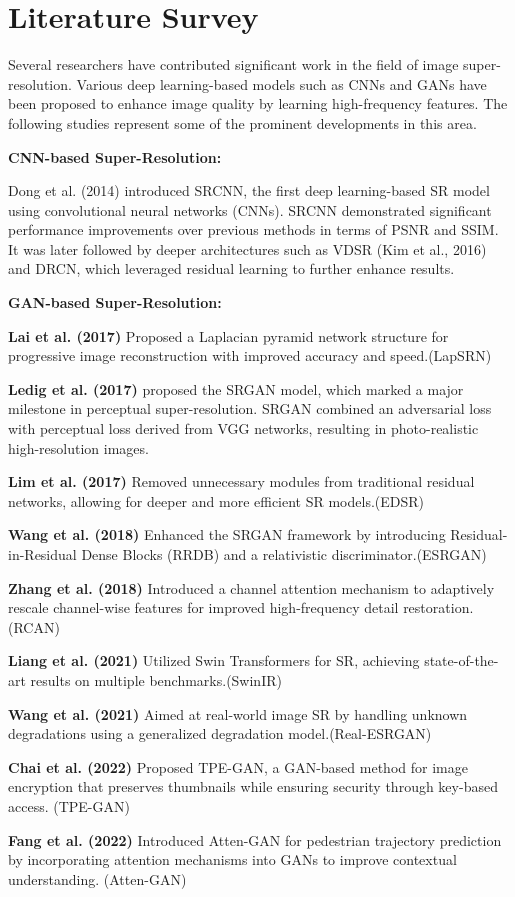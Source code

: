 \chapter{Literature Survey}

Several researchers have contributed significant work in the field of image super-resolution. Various deep learning-based models such as CNNs and GANs have been proposed to enhance image quality by learning high-frequency features. The following studies represent some of the prominent developments in this area.
\vspace{0.5cm}

\textbf{CNN-based Super-Resolution:}

Dong et al. (2014) \cite{a2} introduced SRCNN, the first deep learning-based SR model using convolutional neural networks (CNNs). SRCNN demonstrated significant performance improvements over previous methods in terms of PSNR and SSIM. It was later followed by deeper architectures such as VDSR (Kim et al., 2016) and DRCN, which leveraged residual learning to further enhance results. \cite{a3}

\vspace{0.3cm}

\textbf{GAN-based Super-Resolution:}


\textbf{Lai et al. (2017)} \cite{a10}Proposed a Laplacian pyramid network structure for progressive image reconstruction with improved accuracy and speed.(LapSRN)

\textbf{Ledig et al. (2017)} \cite{a4} proposed the SRGAN model, which marked a major milestone in perceptual super-resolution. SRGAN combined an adversarial loss with perceptual loss derived from VGG networks, resulting in photo-realistic high-resolution images.

\textbf{Lim et al. (2017)} \cite{a9}Removed unnecessary modules from traditional residual networks, allowing for deeper and more efficient SR models.(EDSR) 

\textbf{Wang et al. (2018)} \cite{a5}Enhanced the SRGAN framework by introducing Residual-in-Residual Dense Blocks (RRDB) and a relativistic discriminator.(ESRGAN) 

\textbf{Zhang et al. (2018)} \cite{a8}Introduced a channel attention mechanism to adaptively rescale channel-wise features for improved high-frequency detail restoration.(RCAN) 

\textbf{Liang et al. (2021)} \cite{a7}Utilized Swin Transformers for SR, achieving state-of-the-art results on multiple benchmarks.(SwinIR)


\textbf{Wang et al. (2021)} \cite{a6}Aimed at real-world image SR by handling unknown degradations using a generalized degradation model.(Real-ESRGAN)

\textbf{Chai et al. (2022)} \cite{a11} Proposed TPE-GAN, a GAN-based method for image encryption that preserves thumbnails while ensuring security through key-based access. (TPE-GAN)

\textbf{Fang et al. (2022)} \cite{a12} Introduced Atten-GAN for pedestrian trajectory prediction by incorporating attention mechanisms into GANs to improve contextual understanding. (Atten-GAN)